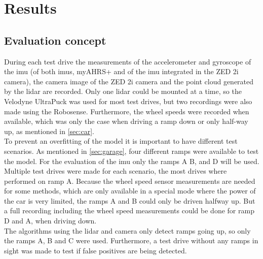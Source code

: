 \chapter{Results}
\label{ch:Results}

\section{Evaluation concept}
During each test drive the measurements of the accelerometer and gyroscope of the \gls{imu} (of both \glspl{imu}, myAHRS+ and of the \gls{imu} integrated in the ZED 2i camera), the camera image of the ZED 2i camera and the point cloud generated by the \gls{lidar} are recorded.
Only one \gls{lidar} could be mounted at a time, so the Velodyne UltraPuck was used for most test drives, but two recordings were also made using the Robosense.
Furthermore, the wheel speeds were recorded when available, which was only the case when driving a ramp down or only half-way up, as mentioned in \cref{sec:car}.\\
To prevent an overfitting of the model it is important to have different test scenarios.
As mentioned in \cref{sec:garage}, four different ramps were available to test the model.
For the evaluation of the \gls{imu} only the ramps A B, and D will be used.
Multiple test drives were made for each scenario, the most drives where performed on ramp A.
Because the wheel speed sensor measurements are needed for some methods, which are only available in a special mode where the power of the car is very limited, the ramps A and B could only be driven halfway up.
But a full recording including the wheel speed measurements could be done for ramp D and A, when driving down.\\
The algorithms using the \gls{lidar} and camera only detect ramps going up, so only the ramps A, B and C were used.
Furthermore, a test drive without any ramps in sight was made to test if false positives are being detected.



